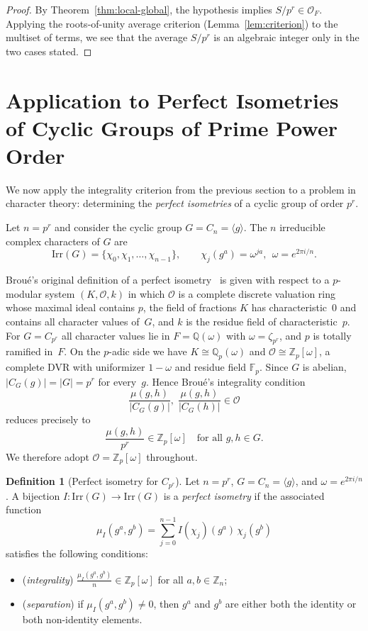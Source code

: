 \documentclass[11pt]{amsart}
\theoremstyle{definition}
\newtheorem{defn}[thm]{Definition}
\theoremstyle{remark}
\numberwithin{equation}{section}
\begin{document}
\begin{proof}
	By Theorem~\ref{thm:local-global}, the hypothesis implies $S/p^r\in \mathcal{O}_F$. Applying the roots-of-unity average criterion (Lemma~\ref{lem:criterion}) to the multiset of terms, we see that the average $S/p^r$ is an algebraic integer only in the two cases stated.
\end{proof}

\section{Application to Perfect Isometries of Cyclic Groups of Prime Power Order}

We now apply the integrality criterion from the previous section to a problem in
character theory: determining the \emph{perfect isometries} of a cyclic group of order $p^r$.

Let $n=p^r$ and consider the cyclic group $G = C_n = \langle g \rangle$.
The $n$ irreducible complex characters of $G$ are
\[
	\mathrm{Irr}(G) = \{\chi_0,\chi_1,\ldots,\chi_{n-1}\}, \qquad
	\chi_j(g^a) = \omega^{ja},\ \ \omega = e^{2\pi i/n}.
\]

Brou\'e's original definition of a perfect isometry~\cite{broue1990isometries}
is given with respect to a $p$-modular system $(K,\mathcal{O},k)$
in which $\mathcal{O}$ is a complete discrete valuation ring whose maximal
ideal contains $p$, the field of fractions $K$ has characteristic~0 and
contains all character values of~$G$, and $k$ is the residue field of
characteristic~$p$.
For $G=C_{p^r}$ all character values lie in $F=\mathbb{Q}(\omega)$
with $\omega=\zeta_{p^r}$, and $p$ is totally ramified in~$F$.
On the $p$-adic side we have $K\cong\mathbb{Q}_p(\omega)$ and
$\mathcal{O}\cong\mathbb{Z}_p[\omega]$, a complete DVR with uniformizer
$1-\omega$ and residue field $\mathbb{F}_p$.
Since $G$ is abelian, $|C_G(g)|=|G|=p^r$ for every~$g$.
Hence Brou\'e's integrality condition
\[
	\frac{\mu(g,h)}{|C_G(g)|},\;
	\frac{\mu(g,h)}{|C_G(h)|}\in\mathcal{O}
\]
reduces precisely to
\[
	\frac{\mu(g,h)}{p^r}\in\mathbb{Z}_p[\omega]\quad\text{for all }g,h\in G.
\]
We therefore adopt $\mathcal{O}=\mathbb{Z}_p[\omega]$ throughout.

\begin{defn}[Perfect isometry for $C_{p^r}$]
	Let $n=p^r$, $G=C_n=\langle g\rangle$, and $\omega=e^{2\pi i/n}$.
	A bijection $I:\mathrm{Irr}(G)\to\mathrm{Irr}(G)$ is a
	\emph{perfect isometry} if the associated function
	\[
		\mu_I(g^a,g^b)=\sum_{j=0}^{n-1} I(\chi_j)(g^a)\,\chi_j(g^b)
	\]
	satisfies the following conditions:
	\begin{itemize}
		\item[(i)] (\emph{integrality}) $\displaystyle \frac{\mu_I(g^a,g^b)}{n}\in
			      \mathbb{Z}_p[\omega]$ for all $a,b\in\mathbb{Z}_n$;
		\item[(ii)] (\emph{separation}) if $\mu_I(g^a,g^b)\neq 0$, then $g^a$ and
		      $g^b$ are either both the identity or both non-identity elements.
	\end{itemize}
\end{defn}
\end{document}
